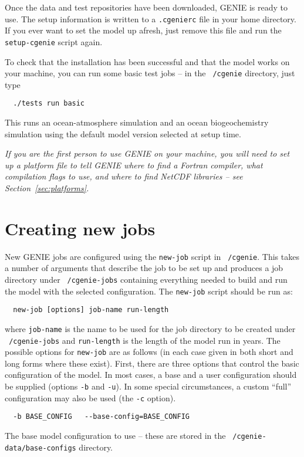 \documentclass[a4paper,10pt,article]{memoir}
\begin{document}
Once the data and test repositories have been downloaded, GENIE is
ready to use.  The setup information is written to a
\texttt{.cgenierc} file in your home directory.  If you ever want to
set the model up afresh, just remove this file and run the
\texttt{setup-cgenie} script again.

To check that the installation has been successful and that the model
works on your machine, you can run some basic test jobs -- in the
\texttt{~/cgenie} directory, just type
\begin{verbatim}
  ./tests run basic
\end{verbatim}
This runs an ocean-atmosphere simulation and an ocean biogeochemistry
simulation using the default model version selected at setup time.

\emph{If you are the first person to use GENIE on your machine, you
  will need to set up a platform file to tell GENIE where to find a
  Fortran compiler, what compilation flags to use, and where to find
  NetCDF libraries -- see Section~\ref{sec:platforms}.}

\section{Creating new jobs}

New GENIE jobs are configured using the \texttt{new-job} script in
\texttt{~/cgenie}.  This takes a number of arguments that describe the
job to be set up and produces a job directory under
\texttt{~/cgenie-jobs} containing everything needed to build and run
the model with the selected configuration.  The \texttt{new-job}
script should be run as:
\begin{verbatim}
  new-job [options] job-name run-length
\end{verbatim}
where \texttt{job-name} is the name to be used for the job directory
to be created under \texttt{~/cgenie-jobs} and \texttt{run-length} is
the length of the model run in years.  The possible options for
\texttt{new-job} are as follows (in each case given in both short and
long forms where these exist).  First, there are three options that
control the basic configuration of the model.  In most cases, a base
and a user configuration should be supplied (options \texttt{-b} and
\texttt{-u}).  In some special circumstances, a custom ``full''
configuration may also be used (the \texttt{-c} option).

\begin{verbatim}
  -b BASE_CONFIG   --base-config=BASE_CONFIG
\end{verbatim}
The base model configuration to use -- these are stored in the
\texttt{~/cgenie-data/base-configs} directory.
\end{document}
